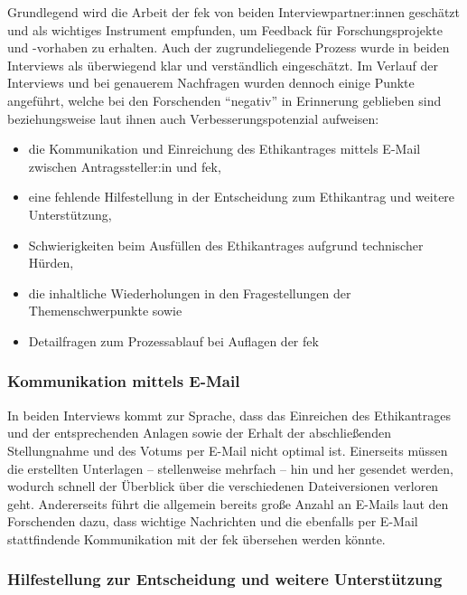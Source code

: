 \documentclass[a4paper,12pt,twoside]{scrreprt}
\begin{document}
Grundlegend wird die Arbeit der \ac{fek} von beiden Interviewpartner:innen geschätzt und als wichtiges Instrument empfunden, um Feedback für Forschungsprojekte und -vorhaben zu erhalten. Auch der zugrundeliegende Prozess wurde in beiden Interviews als überwiegend klar und verständlich eingeschätzt. Im Verlauf der Interviews und bei genauerem Nachfragen wurden dennoch einige Punkte angeführt, welche bei den Forschenden \enquote{negativ} in Erinnerung geblieben sind beziehungsweise laut ihnen auch Verbesserungspotenzial aufweisen:
\begin{itemize}
    \item die Kommunikation und Einreichung des Ethikantrages mittels E-Mail zwischen Antragssteller:in und \ac{fek},
    \item eine fehlende Hilfestellung in der Entscheidung zum Ethikantrag und weitere Unterstützung,
    \item Schwierigkeiten beim Ausfüllen des Ethikantrages aufgrund technischer Hürden,
    \item die inhaltliche Wiederholungen in den Fragestellungen der Themenschwerpunkte sowie
    \item Detailfragen zum Prozessablauf bei Auflagen der \ac{fek}
\end{itemize}

\subsubsection*{Kommunikation mittels E-Mail}
\label{sub-sub-sec:kommunikation-email}

In beiden Interviews kommt zur Sprache, dass das Einreichen des Ethikantrages und der entsprechenden Anlagen sowie der Erhalt der abschließenden Stellungnahme und des Votums per E-Mail nicht optimal ist. Einerseits müssen die erstellten Unterlagen -- stellenweise mehrfach -- hin und her gesendet werden, wodurch schnell der Überblick über die verschiedenen Dateiversionen verloren geht. Andererseits führt die allgemein bereits große Anzahl an E-Mails laut den Forschenden dazu, dass wichtige Nachrichten und die ebenfalls per E-Mail stattfindende Kommunikation mit der \ac{fek} übersehen werden könnte.

\subsubsection*{Hilfestellung zur Entscheidung und weitere Unterstützung}
\label{sub-sub-sec:hilfestellung-unterstützung}
\end{document}
